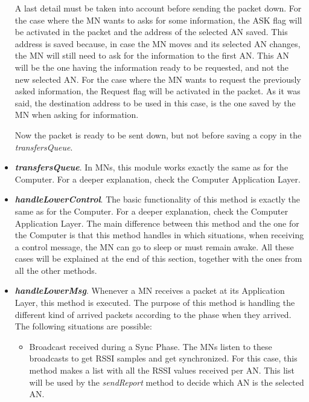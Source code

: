 \begin{itemize}
  A last detail must be taken into account before sending the packet down. For the case where the \ac{MN} wants to asks for some information, the 
  ASK flag will be activated in the packet and the address of the selected \ac{AN} saved. This address is saved because, in case the \ac{MN} moves 
  and its selected \ac{AN} changes, the \ac{MN} will still need to ask for the information to the first \ac{AN}. This \ac{AN} will be the one 
  having the information ready to be requested, and not the new selected \ac{AN}. For the case where the \ac{MN} wants to request the previously 
  asked information, the Request flag will be activated in the packet. As it was said, the destination address to be used in this case, is the 
  one saved by the \ac{MN} when asking for information.

  Now the packet is ready to be sent down, but not before saving a copy in the \textit{transfersQueue}.

  \item \textbf{\textit{transfersQueue}}. In \acp{MN}, this module works exactly the same as for the Computer. For a deeper explanation, check
  the Computer Application Layer.

  \item \textbf{\textit{handleLowerControl}}. The basic functionality of this method is exactly the same as for the Computer. For a deeper explanation, 
  check the Computer Application Layer. The main difference between this method and the one for the Computer is that this method handles in which 
  situations, when receiving a control message, the \ac{MN} can go to sleep or must remain awake. All these cases will be explained at the end of this
  section, together with the ones from all the other methods.

  \item \textbf{\textit{handleLowerMsg}}. Whenever a \ac{MN} receives a packet at its Application Layer, this method is executed. The purpose
  of this method is handling the different kind of arrived packets according to the phase when they arrived. The following situations are possible:
  \begin{itemize}
    \item Broadcast received during a Sync Phase. The \acp{MN} listen to these broadcasts to get \ac{RSSI} samples and get synchronized. For this 
    case, this method makes a list with all the \ac{RSSI} values received per \ac{AN}. This list will be used by the \textit{sendReport} method to 
    decide which \ac{AN} is the selected \ac{AN}.


\end{itemize}
\end{itemize}
